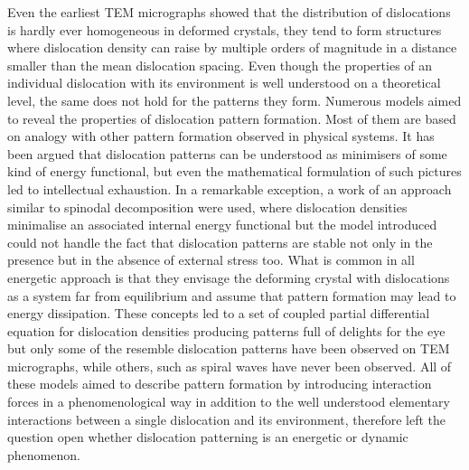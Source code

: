 Even the earliest TEM micrographs showed that the distribution of dislocations is hardly ever homogeneous in deformed crystals, they tend to form structures where dislocation density can raise by multiple orders of magnitude in a distance smaller than the mean dislocation spacing. Even though the properties of an individual dislocation with its environment is well understood on a theoretical level, the same does not hold for the patterns they form. Numerous models aimed to reveal the properties of dislocation pattern formation. Most of them are based on analogy with other pattern formation observed in physical systems. It has been argued that dislocation patterns can be understood as minimisers of some kind of energy functional, but even the mathematical formulation of such pictures led to intellectual exhaustion. In a remarkable exception, a work of \citet{holt1970dislocation} an approach similar to spinodal decomposition were used, where dislocation densities minimalise an associated internal energy functional but the model introduced could not handle the fact that dislocation patterns are stable not only in the presence but in the absence of external stress too. What is common in all energetic approach is that they envisage the deforming crystal with dislocations as a system far from equilibrium and assume that pattern formation may lead to energy dissipation. These concepts led to a set of coupled partial differential equation for dislocation densities \cite{WalgraefAifantisJournal,pontes2006dislocation} producing patterns full of delights for the eye but only some of the resemble dislocation patterns have been observed on TEM micrographs, while others, such as spiral waves have never been observed\cite{salazar1995dislocation}. All of these models aimed to describe pattern formation by introducing 
interaction forces in a phenomenological way in addition to the well understood elementary interactions between a single dislocation and its environment, therefore left the question open whether dislocation patterning is an energetic or dynamic phenomenon\cite{nabarro2000complementary}.


